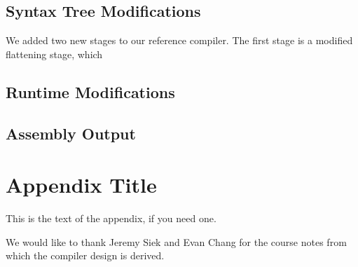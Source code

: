 \documentclass{sigplanconf}
\begin{document}
\subsection{Syntax Tree Modifications}
We added two new stages to our reference compiler.  The first stage is a modified flattening stage, which 
\subsection{Runtime Modifications}
\subsection{Assembly Output}

\appendix
\section{Appendix Title}

This is the text of the appendix, if you need one.

\acks

We would like to thank Jeremy Siek and Evan Chang for the course notes from which the compiler design is derived.




\end{document}
